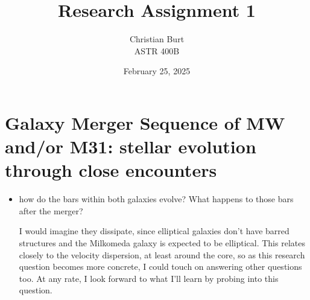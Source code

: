 \documentclass{article}
\title{Research Assignment 1}
\author{Christian Burt\\ASTR 400B}
\date{February 25, 2025}
\begin{document}
\maketitle
\setcounter{section}{4} %
    
\section{Galaxy Merger Sequence of MW and/or M31: stellar evolution
  through close encounters}
    
  \begin{itemize}
  \item how do the bars within both galaxies evolve? What happens to
    those bars after the merger?
  \newline

  I would imagine they dissipate, since elliptical galaxies don't have
  barred structures and the Milkomeda galaxy is expected to be
  elliptical. This relates closely to the velocity dispersion, at
  least around the core, so as this research question becomes more
  concrete, I could touch on answering other questions too. At any
  rate, I look forward to what I'll learn by probing into this
  question.
          
  \end{itemize}
    
\end{document}
